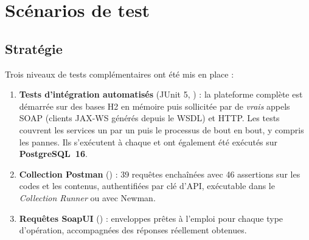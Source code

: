 \chapter{Scénarios de test}\label{chap:tests}

\section{Stratégie}
Trois niveaux de tests complémentaires ont été mis en place :
\begin{enumerate}
  \item \textbf{Tests d'intégration automatisés} (JUnit 5, ) : la plateforme complète est démarrée
        sur des bases H2 en mémoire puis sollicitée par de \emph{vrais} appels SOAP (clients JAX-WS générés depuis le WSDL)
        et HTTP. Les tests couvrent les services un par un puis le processus de bout en bout, y compris les pannes.
        Ils s'exécutent à chaque  et ont également été exécutés sur \textbf{PostgreSQL~16}.
  \item \textbf{Collection Postman} () : 39 requêtes enchaînées avec 46 assertions sur les codes
        et les contenus, authentifiées par clé d'API, exécutable dans le \emph{Collection Runner} ou avec Newman.
  \item \textbf{Requêtes SoapUI} () : enveloppes prêtes à l'emploi pour chaque type d'opération,
        accompagnées des réponses réellement obtenues.
\end{enumerate}

